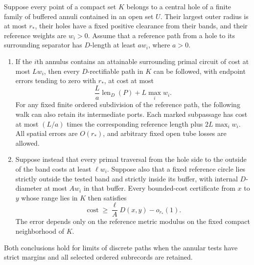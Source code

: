 \begin{lemma}
\label{met:chain}
Suppose every point of a compact set $K$ belongs to a central hole of a
finite family of buffered annuli contained in an open set $U$.  Their
largest outer radius is at most $r_*$, their holes have a fixed positive
clearance from their bands, and their reference weights are $w_i>0$.
Assume that a reference path from a hole to its surrounding separator
has $D$-length at least $a w_i$, where $a>0$.
\begin{enumerate}
\item If the $i$th annulus contains an attainable surrounding primal
circuit of cost at most $Lw_i$, then every $D$-rectifiable path in $K$
can be followed, with endpoint errors tending to zero with $r_*$, at
cost at most
\[
 \frac{L}{a}\operatorname{len}_D(P)+L\max_i w_i.
\]
For any fixed finite ordered subdivision of the reference path, the
following walk can also retain its intermediate ports.  Each marked
subpassage has cost at most $(L/a)$ times the corresponding reference
length plus $2L\max_iw_i$.  All spatial errors are $O(r_*)$, and
arbitrary fixed open tube losses are allowed.
\item Suppose instead that every primal traversal from the hole side
to the outside of the band costs at least $\ell w_i$.  Suppose also
that a fixed reference circle lies strictly outside the tested band
and strictly inside its buffer, with internal $D$-diameter at most
$Aw_i$ in that buffer.  Every bounded-cost
certificate from $x$ to $y$ whose range lies in $K$ then satisfies
\[
 \operatorname{cost}\geq \frac{\ell}{A}D(x,y)-o_{r_*}(1).
\]
The error depends only on the reference metric modulus on the fixed
compact neighborhood of $K$.
\end{enumerate}
Both conclusions hold for limits of discrete paths when the annular
tests have strict margins and all selected ordered subrecords are
retained.
\end{lemma}

